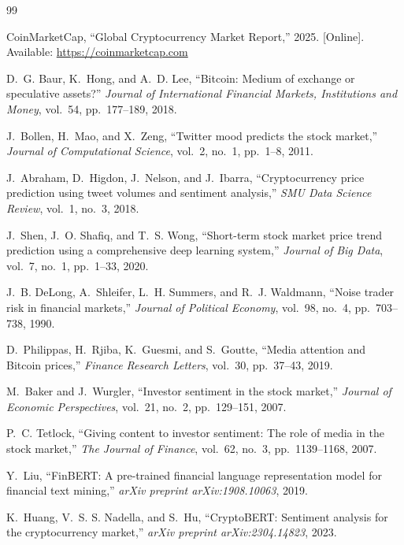 \documentclass[journal]{IEEEtran}
\begin{document}
\begin{thebibliography}{99}

CoinMarketCap, ``Global Cryptocurrency Market Report,'' 2025.
[Online]. Available: \url{https://coinmarketcap.com}

D.~G. Baur, K.~Hong, and A.~D. Lee,
``Bitcoin: Medium of exchange or speculative assets?''
\textit{Journal of International Financial Markets, Institutions and Money},
vol.~54, pp.~177--189, 2018.

J.~Bollen, H.~Mao, and X.~Zeng,
``Twitter mood predicts the stock market,''
\textit{Journal of Computational Science}, vol.~2, no.~1, pp.~1--8, 2011.

J.~Abraham, D.~Higdon, J.~Nelson, and J.~Ibarra,
``Cryptocurrency price prediction using tweet volumes and sentiment analysis,''
\textit{SMU Data Science Review}, vol.~1, no.~3, 2018.

J.~Shen, J.~O. Shafiq, and T.~S. Wong,
``Short-term stock market price trend prediction using a
comprehensive deep learning system,''
\textit{Journal of Big Data}, vol.~7, no.~1, pp.~1--33, 2020.

J.~B. DeLong, A.~Shleifer, L.~H. Summers, and R.~J. Waldmann,
``Noise trader risk in financial markets,''
\textit{Journal of Political Economy}, vol.~98, no.~4, pp.~703--738, 1990.

D.~Philippas, H.~Rjiba, K.~Guesmi, and S.~Goutte,
``Media attention and Bitcoin prices,''
\textit{Finance Research Letters}, vol.~30, pp.~37--43, 2019.

M.~Baker and J.~Wurgler,
``Investor sentiment in the stock market,''
\textit{Journal of Economic Perspectives}, vol.~21, no.~2, pp.~129--151, 2007.

P.~C. Tetlock,
``Giving content to investor sentiment: The role of media in the stock market,''
\textit{The Journal of Finance}, vol.~62, no.~3, pp.~1139--1168, 2007.

Y.~Liu,
``FinBERT: A pre-trained financial language representation model for
financial text mining,''
\textit{arXiv preprint arXiv:1908.10063}, 2019.

K.~Huang, V.~S. S. Nadella, and S.~Hu,
``CryptoBERT: Sentiment analysis for the cryptocurrency market,''
\textit{arXiv preprint arXiv:2304.14823}, 2023.


\end{thebibliography}
\end{document}
